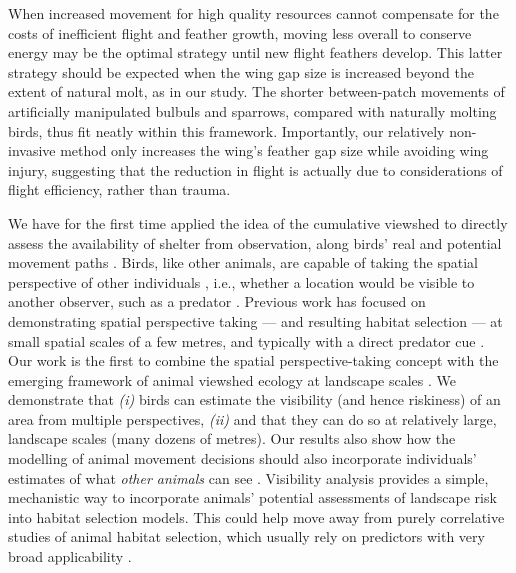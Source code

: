 \begin{refsection}
When increased movement for high quality resources \cite{charnov1976} cannot compensate for the costs of inefficient flight and feather growth, moving less overall to conserve energy may be the optimal strategy until new flight feathers develop.
This latter strategy should be expected when the wing gap size is increased beyond the extent of natural molt, as in our study.
The shorter between-patch movements of artificially manipulated bulbuls and sparrows, compared with naturally molting birds, thus fit neatly within this framework.
Importantly, our relatively non-invasive method only increases the wing's feather gap size while avoiding wing injury, suggesting that the reduction in flight is actually due to considerations of flight efficiency, rather than trauma.

We have for the first time applied the idea of the cumulative viewshed to directly assess the availability of shelter from observation, along birds' real and potential movement paths \cite{olsoy2015}.
Birds, like other animals, are capable of taking the spatial perspective of other individuals \cite{emery2000,krams2001,watve2002,davidson2016}, i.e., whether a location would be visible to another observer, such as a predator \citep{watve2002,olsoy2015}.
Previous work has focused on demonstrating spatial perspective taking --- and resulting habitat selection --- at small spatial scales of a few metres, and typically with a direct predator cue \cite{krams2001,watve2002}.
Our work is the first to combine the spatial perspective-taking concept with the emerging framework of animal viewshed ecology at landscape scales \cite{aben2018,aben2021}.
We demonstrate that \textit{(i)} birds can estimate the visibility (and hence riskiness) of an area from multiple perspectives, \textit{(ii)} and that they can do so at relatively large, landscape scales (many dozens of metres).
Our results also show how the modelling of animal movement decisions should also incorporate individuals' estimates of what \textit{other animals} can see \cite{emery2000}.
Visibility analysis provides a simple, mechanistic way to incorporate animals' potential assessments of landscape risk into habitat selection models.
This could help move away from purely correlative studies of animal habitat selection, which usually rely on predictors with very broad applicability \cite{pettorelli2011}.


\end{refsection}
